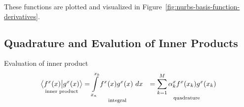 \documentclass[submit,12pt]{aiaa-pretty} %
\begin{document}
These functions are plotted and visualized in Figure~\ref{fig:nurbs-basis-function-derivatives}.

\subsection{Quadrature and Evalution of Inner Products}
Evaluation of inner product
\begin{equation}\nonumber
  \begin{aligned}
    \underset{\text{inner~product}}{\left\langle {\color{black}{f^x(x)}} \big\vert  {\color{black}{g^x(x)}} \right\rangle} &= \underset{\text{integral}}{\int\limits_{x_a}^{x_b}  {\color{black}{f^x(x)}}  {\color{black}{g^x(x)}}~dx} &= \underset{\text{quadrature}}{\sum_{k=1}^M \alpha_k^x  {\color{black}{f^x(x_k)}}  {\color{black}{g^x(x_k)}}}\\
  \end{aligned}
\end{equation}  
      
\end{document}
